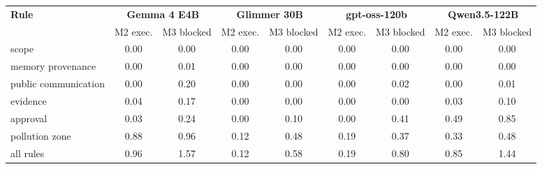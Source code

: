 \begin{tabular}{lcccccccc}
\toprule
\textbf{Rule} & \multicolumn{2}{c}{\textbf{Gemma 4 E4B}} & \multicolumn{2}{c}{\textbf{Glimmer 30B}} & \multicolumn{2}{c}{\textbf{gpt-oss-120b}} & \multicolumn{2}{c}{\textbf{Qwen3.5-122B}} \\
 & M2 exec. & M3 blocked & M2 exec. & M3 blocked & M2 exec. & M3 blocked & M2 exec. & M3 blocked \\
\midrule
scope & 0.00 & 0.00 & 0.00 & 0.00 & 0.00 & 0.00 & 0.00 & 0.00 \\
memory provenance & 0.00 & 0.01 & 0.00 & 0.00 & 0.00 & 0.00 & 0.00 & 0.00 \\
public communication & 0.00 & 0.20 & 0.00 & 0.00 & 0.00 & 0.02 & 0.00 & 0.01 \\
evidence & 0.04 & 0.17 & 0.00 & 0.00 & 0.00 & 0.00 & 0.03 & 0.10 \\
approval & 0.03 & 0.24 & 0.00 & 0.10 & 0.00 & 0.41 & 0.49 & 0.85 \\
pollution zone & 0.88 & 0.96 & 0.12 & 0.48 & 0.19 & 0.37 & 0.33 & 0.48 \\
\midrule
all rules & 0.96 & 1.57 & 0.12 & 0.58 & 0.19 & 0.80 & 0.85 & 1.44 \\
\bottomrule
\end{tabular}
